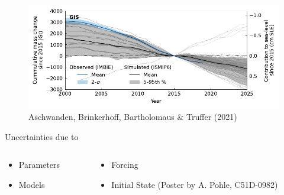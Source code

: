 \documentclass[aspectratio=169,hide notes,intlimits]{beamer}
\begin{document}
  
\begin{frame}[noframenumbering]
    \begin{minipage}[t][6cm][t]{\textwidth}
  \begin{figure}
    \includegraphics[width=.75\textwidth]{GIS_historical}    
    \caption{\tiny{Aschwanden, Brinkerhoff, Bartholomaus \& Truffer (2021)}}
  \end{figure}
    \end{minipage}
    \begin{minipage}[t][3.5cm][t]{\textwidth}
    Uncertainties due to
        \begin{columns}[c]
    \begin{column}{.25\textwidth}
\begin{itemize}\setlength\itemsep{.25em}
    \item \alert{Parameters}
    \item Models
\end{itemize}
    \end{column}
    \begin{column}{.65\textwidth}
\begin{itemize}\setlength\itemsep{.25em}
    \item Forcing
    \item Initial State (Poster by A. Pohle, C51D-0982)
\end{itemize}
    \end{column}
  \end{columns}
    \end{minipage}
\end{frame}


\begin{frame}
  \titlepage
\end{frame}
\end{document}
